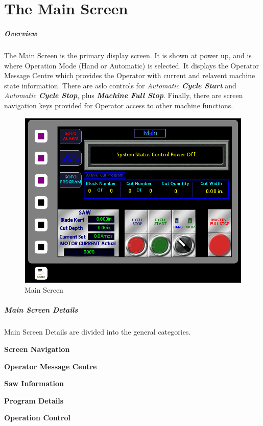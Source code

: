 \chapter{The Main Screen}
\paragraph{Overview}
The Main Screen is the primary display screen. It is shown at power up, and is where Operation Mode (Hand or Automatic) is selected. It displays the Operator Message Centre which provides the Operator with current and relavent machine state information. There are aslo controls for \textit{Automatic \textbf{Cycle Start}} and \textit{Automatic \textbf{Cycle Stop}}, plus \textbf{\textit{Machine Full Stop}}. Finally, there are screen navigation keys provided for Operator access to other machine functions.
\begin{figure}
	\centering
	\includegraphics[width=0.5\linewidth]{screen-captures/main-screen}
	\caption{Main Screen}
	\label{fig:main-screen}
\end{figure}
\pagebreak
\paragraph{Main Screen Details}
Main Screen Details are divided into the general categories.
\begin{list}{-}{}
	\item \textbf{Screen Navigation}
	\item \textbf{Operator Message Centre}
	\item \textbf{Saw Information}
	\item \textbf{Program Details}
	\item \textbf{Operation Control}
\end{list}

